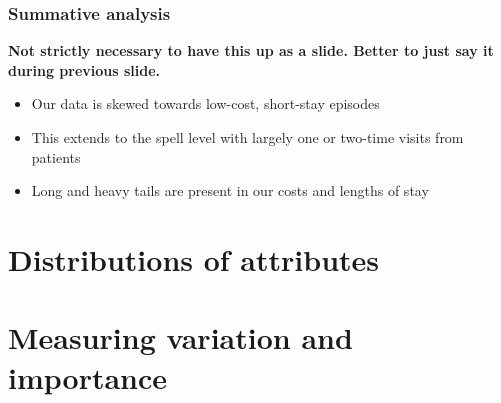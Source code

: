 \graphicspath{{./img/general/}}

\begin{frame}
    \frametitle{Summative analysis}
    \textbf{Not strictly necessary to have this up as a slide. Better to just
    say it during previous slide.}
    \begin{itemize}
        \pause%
        \item Our data is skewed towards low-cost, short-stay episodes
        \pause%
        \item This extends to the spell level with largely one or two-time
            visits from patients
        \pause%
        \item Long and heavy tails are present in our costs and lengths of stay
    \end{itemize}
\end{frame}

\section{Distributions of attributes}

\section{Measuring variation and importance}

